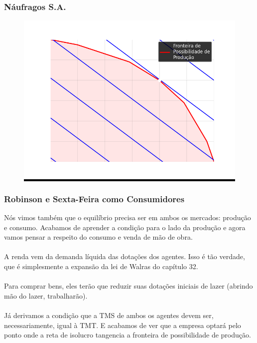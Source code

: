 \documentclass{beamer}[10]
\begin{document}
\begin{frame}
	\frametitle{Náufragos S.A.}

	\begin{figure}[H]
		\centering
		\colorbox{black}{\includegraphics[scale=0.6]{cap33_12-max_lucros.png}}
	\end{figure}

\end{frame}

\begin{frame}
	\frametitle{Robinson e Sexta-Feira como Consumidores}

	Nós vimos também que o equilíbrio precisa ser em ambos os mercados: produção e consumo. Acabamos de aprender a condição para o lado da produção e agora vamos pensar a respeito do consumo e venda de mão de obra.
	\\~\\
	A renda vem da demanda líquida das dotações dos agentes. Isso é tão verdade, que é simplesmente a expansão da lei de Walras do capítulo 32.
	\\~\\
	Para comprar bens, eles terão que reduzir suas dotações iniciais de lazer (abrindo mão do lazer, trabalharão).
	\\~\\
	Já derivamos a condição que a TMS de ambos os agentes devem ser, necessariamente, igual à TMT. E acabamos de ver que a empresa optará pelo ponto onde a reta de isolucro tangencia a fronteira de possibilidade de produção.

\end{frame}
\end{document}
